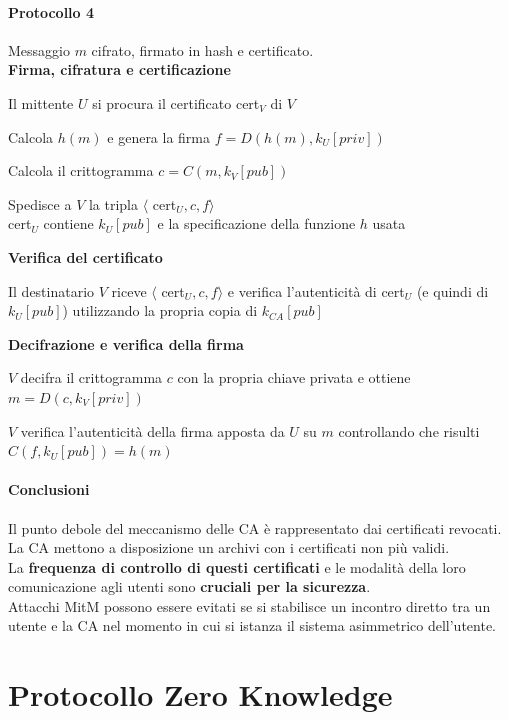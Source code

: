 \documentclass[10pt]{book}
\begin{document}
\paragraph{Protocollo 4} Messaggio $m$ cifrato, firmato in hash e certificato.\\
\textbf{Firma, cifratura e certificazione}
\begin{list}{}{}
	\item Il mittente $U$ si procura il certificato cert$_V$ di $V$
	\item Calcola $h(m)$ e genera la firma $f = D(h(m), k_U[priv])$
	\item Calcola il crittogramma $c = C(m, k_V[pub])$
	\item Spedisce a $V$ la tripla $\langle$ cert$_U, c,f\rangle$\\
cert$_U$ contiene $k_U[pub]$ e la specificazione della funzione $h$ usata	
\end{list}
\textbf{Verifica del certificato}
\begin{list}{}{}
	\item Il destinatario $V$ riceve $\langle$ cert$_U, c,f\rangle$ e verifica l'autenticità di cert$_U$ (e quindi di $k_U[pub]$) utilizzando la propria copia di $k_{CA}[pub]$
\end{list}
\textbf{Decifrazione e verifica della firma}
\begin{list}{}{}
	\item $V$ decifra il crittogramma $c$ con la propria chiave privata e ottiene $m = D(c, k_V[priv])$
	\item $V$ verifica l'autenticità della firma apposta da $U$ su $m$ controllando che risulti $C(f,k_U[pub]) = h(m)$
\end{list}
\paragraph{Conclusioni} Il punto debole del meccanismo delle CA è rappresentato dai certificati revocati. La CA mettono a disposizione un archivi con i certificati non più validi.\\
La \textbf{frequenza di controllo di questi certificati} e le modalità della loro comunicazione agli utenti sono \textbf{cruciali per la sicurezza}.\\
Attacchi MitM possono essere evitati se si stabilisce un incontro diretto tra un utente e la CA nel momento in cui si istanza il sistema asimmetrico dell'utente.
\section{Protocollo Zero Knowledge}
\end{document}
